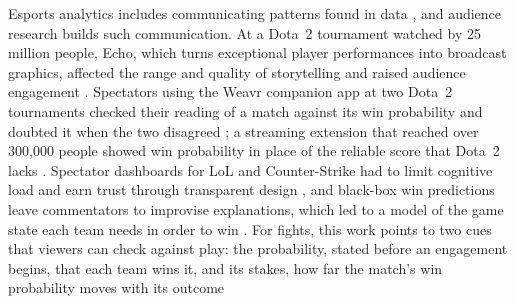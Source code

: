 Esports analytics includes communicating patterns found in data \cite{schubert2016encounter}, and
audience research builds such communication. At a Dota~2 tournament watched by 25 million people,
Echo, which turns exceptional player performances into broadcast graphics, affected the range and
quality of storytelling and raised audience engagement \cite{block2018narrative}. Spectators using
the Weavr companion app at two Dota~2 tournaments checked their reading of a match against its win
probability and doubted it when the two disagreed \cite{kokkinakis2020dax}; a streaming
extension that reached over 300,000 people showed win probability in place of the reliable score that
Dota~2 lacks \cite{pedrassoli2024passive}.
Spectator dashboards for LoL and Counter-Strike had to limit cognitive load and earn trust through
transparent design \cite{charleer2018dashboards}, and black-box win predictions leave commentators to
improvise explanations, which led to a model of the game state each team needs in order to win
\cite{pedrassoli2024wincondition}. For fights, this work points to two cues that viewers can check
against play: the probability, stated before an engagement begins, that each team wins it, and its
stakes, how far the match's win probability moves with its outcome
